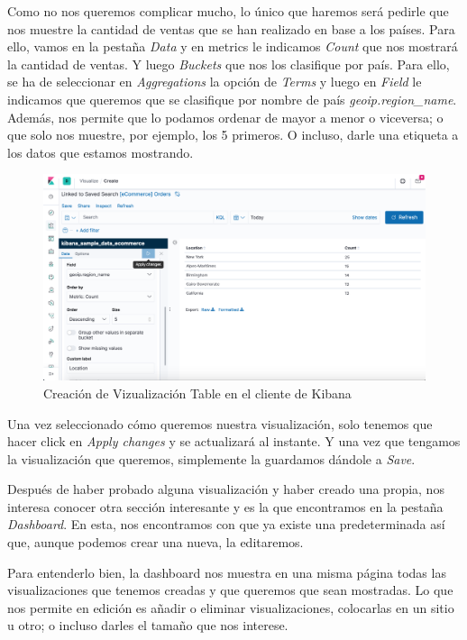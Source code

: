 \documentclass[a4paper, 12pt]{book}
\begin{document}
Como no nos queremos complicar mucho, lo único que haremos será pedirle que nos muestre la cantidad de ventas que se han realizado en base a los países. Para ello, vamos en la pestaña \textit{Data} y en metrics le indicamos \textit{Count} que nos mostrará la cantidad de ventas. Y luego \textit{Buckets} que nos los clasifique por país. Para ello, se ha de seleccionar en \textit{Aggregations} la opción de \textit{Terms} y luego en \textit{Field} le indicamos que queremos que se clasifique por nombre de país \textit{geoip.region\_name}. Además, nos permite que lo podamos ordenar de mayor a menor o viceversa; o que solo nos muestre, por ejemplo, los 5 primeros. O incluso, darle una etiqueta a los datos que estamos mostrando.

\begin{figure}[H]
  \centering
  \includegraphics[width=12cm, keepaspectratio]{img/development/kibana-table-editor.png}
  \caption{Creación de Vizualización Table en el cliente de Kibana}
  \label{fig:Kibanatable}
\end{figure}

Una vez seleccionado cómo queremos nuestra visualización, solo tenemos que hacer click en \textit{Apply changes} y se actualizará al instante. Y una vez que tengamos la visualización que queremos, simplemente la guardamos dándole a \textit{Save}.

Después de haber probado alguna visualización y haber creado una propia, nos interesa conocer otra sección interesante y es la que encontramos en la pestaña \textit{Dashboard}. En esta, nos encontramos con que ya existe una predeterminada así que, aunque podemos crear una nueva, la editaremos.

Para entenderlo bien, la dashboard nos muestra en una misma página todas las visualizaciones que tenemos creadas y que queremos que sean mostradas. Lo que nos permite en edición es añadir o eliminar visualizaciones, colocarlas en un sitio u otro; o incluso darles el tamaño que nos interese.
\end{document}
